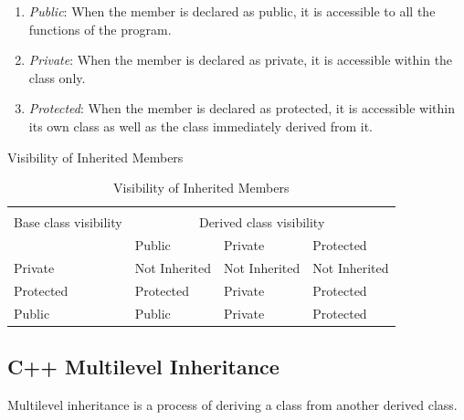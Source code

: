 \documentclass{book}
\begin{document}
\begin{enumerate}
	\item \textit{Public}: When the member is declared as public, it is accessible to all the functions of the program.
\item \textit{Private}: When the member is declared as private, it is accessible within the class only.
\item \textit{Protected}: When the member is declared as protected, it is accessible within its own class as well as the class immediately derived from it.
\end{enumerate}

Visibility of Inherited Members

\begin{table}
\centering
\small 
\begin{tabular}{l|lll} \hline \\
Base class visibility	& \multicolumn{3}{c}{Derived class visibility} \\ \hline 
& Public	& Private	& Protected \\ \hline 
Private	& Not Inherited	& Not Inherited	& Not Inherited \\
Protected	& Protected	& Private	& Protected \\
Public	& Public	& Private	& Protected \\ \hline 

\end{tabular}
\caption{Visibility of Inherited Members}
\end{table}
\normalsize

\subsection{C++ Multilevel Inheritance}

Multilevel inheritance is a process of deriving a class from another derived class.
\end{document}
